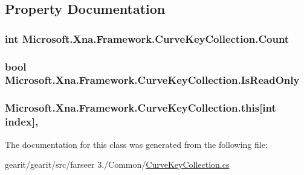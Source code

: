 \subsection{Property Documentation}
\hypertarget{class_microsoft_1_1_xna_1_1_framework_1_1_curve_key_collection_a58068baad27c2916a8042825ff32c13b}{
\subsubsection[{Count}]{\setlength{\rightskip}{0pt plus 5cm}int Microsoft.\+Xna.\+Framework.\+Curve\+Key\+Collection.\+Count\hspace{0.3cm}{\ttfamily [get]}}}\label{class_microsoft_1_1_xna_1_1_framework_1_1_curve_key_collection_a58068baad27c2916a8042825ff32c13b}
\hypertarget{class_microsoft_1_1_xna_1_1_framework_1_1_curve_key_collection_a0e8e1168dd6a95b3d6ae5228555adaf3}{
\subsubsection[{Is\+Read\+Only}]{\setlength{\rightskip}{0pt plus 5cm}bool Microsoft.\+Xna.\+Framework.\+Curve\+Key\+Collection.\+Is\+Read\+Only\hspace{0.3cm}{\ttfamily [get]}}}\label{class_microsoft_1_1_xna_1_1_framework_1_1_curve_key_collection_a0e8e1168dd6a95b3d6ae5228555adaf3}
\hypertarget{class_microsoft_1_1_xna_1_1_framework_1_1_curve_key_collection_aefe0dbc76a62961098b1a26e30dbe602}{
\subsubsection[{this[int index]}]{ Microsoft.\+Xna.\+Framework.\+Curve\+Key\+Collection.\+this\mbox{[}int index\mbox{]}\hspace{0.3cm}{\ttfamily [get]}, {\ttfamily [set]}}}\label{class_microsoft_1_1_xna_1_1_framework_1_1_curve_key_collection_aefe0dbc76a62961098b1a26e30dbe602}


The documentation for this class was generated from the following file\+:\begin{DoxyCompactItemize}
\item 
gearit/gearit/src/farseer 3./\+Common/\hyperlink{_curve_key_collection_8cs}{Curve\+Key\+Collection.\+cs}\end{DoxyCompactItemize}
